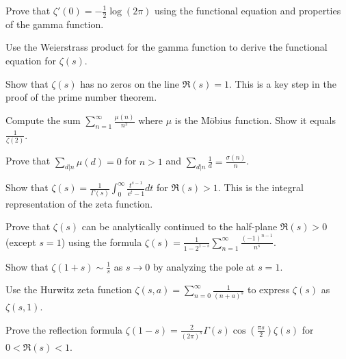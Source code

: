 \begin{exercise}
Prove that $\zeta'(0) = -\frac{1}{2}\log(2\pi)$ using the functional equation and properties of the gamma function.
\end{exercise}

\begin{exercise}
Use the Weierstrass product for the gamma function to derive the functional equation for $\zeta(s)$.
\end{exercise}

\begin{exercise}
Show that $\zeta(s)$ has no zeros on the line $\Re(s) = 1$. This is a key step in the proof of the prime number theorem.
\end{exercise}

\begin{exercise}
Compute the sum $\sum_{n=1}^\infty \frac{\mu(n)}{n^2}$ where $\mu$ is the Möbius function. Show it equals $\frac{1}{\zeta(2)}$.
\end{exercise}

\begin{exercise}
Prove that $\sum_{d|n} \mu(d) = 0$ for $n > 1$ and $\sum_{d|n} \frac{1}{d} = \frac{\sigma(n)}{n}$.
\end{exercise}

\begin{exercise}
Show that $\zeta(s) = \frac{1}{\Gamma(s)} \int_0^\infty \frac{t^{s-1}}{e^t - 1} dt$ for $\Re(s) > 1$. This is the integral representation of the zeta function.
\end{exercise}

\begin{exercise}
Prove that $\zeta(s)$ can be analytically continued to the half-plane $\Re(s) > 0$ (except $s=1$) using the formula $\zeta(s) = \frac{1}{1-2^{1-s}} \sum_{n=1}^\infty \frac{(-1)^{n-1}}{n^s}$.
\end{exercise}

\begin{exercise}
Show that $\zeta(1+s) \sim \frac{1}{s}$ as $s \to 0$ by analyzing the pole at $s=1$.
\end{exercise}

\begin{exercise}
Use the Hurwitz zeta function $\zeta(s,a) = \sum_{n=0}^\infty \frac{1}{(n+a)^s}$ to express $\zeta(s)$ as $\zeta(s,1)$.
\end{exercise}

\begin{exercise}
Prove the reflection formula $\zeta(1-s) = \frac{2}{(2\pi)^s} \Gamma(s) \cos(\frac{\pi s}{2}) \zeta(s)$ for $0 < \Re(s) < 1$.
\end{exercise}
